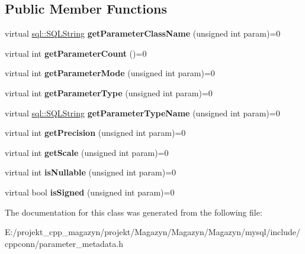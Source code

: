\subsection*{Public Member Functions}
\begin{DoxyCompactItemize}
\item 
\hypertarget{classsql_1_1_parameter_meta_data_a4eac0bdf826073bab398b6c92a53b7fe}{}\label{classsql_1_1_parameter_meta_data_a4eac0bdf826073bab398b6c92a53b7fe} 
virtual \hyperlink{classsql_1_1_s_q_l_string}{sql\+::\+S\+Q\+L\+String} {\bfseries get\+Parameter\+Class\+Name} (unsigned int param)=0
\item 
\hypertarget{classsql_1_1_parameter_meta_data_a76300959d4703649ea996691ec9ddc70}{}\label{classsql_1_1_parameter_meta_data_a76300959d4703649ea996691ec9ddc70} 
virtual int {\bfseries get\+Parameter\+Count} ()=0
\item 
\hypertarget{classsql_1_1_parameter_meta_data_ab46c3024b12b4b7a75b81d32340bc53b}{}\label{classsql_1_1_parameter_meta_data_ab46c3024b12b4b7a75b81d32340bc53b} 
virtual int {\bfseries get\+Parameter\+Mode} (unsigned int param)=0
\item 
\hypertarget{classsql_1_1_parameter_meta_data_a604aefdf3399674c54548ffd6d09dbd7}{}\label{classsql_1_1_parameter_meta_data_a604aefdf3399674c54548ffd6d09dbd7} 
virtual int {\bfseries get\+Parameter\+Type} (unsigned int param)=0
\item 
\hypertarget{classsql_1_1_parameter_meta_data_ae2dce4bf0b8a3e5194406f7d7d07eb88}{}\label{classsql_1_1_parameter_meta_data_ae2dce4bf0b8a3e5194406f7d7d07eb88} 
virtual \hyperlink{classsql_1_1_s_q_l_string}{sql\+::\+S\+Q\+L\+String} {\bfseries get\+Parameter\+Type\+Name} (unsigned int param)=0
\item 
\hypertarget{classsql_1_1_parameter_meta_data_a85a283b336695e7518cb35836b81cd6b}{}\label{classsql_1_1_parameter_meta_data_a85a283b336695e7518cb35836b81cd6b} 
virtual int {\bfseries get\+Precision} (unsigned int param)=0
\item 
\hypertarget{classsql_1_1_parameter_meta_data_aea9fa32949a6c4ccf6ef438d0e18fd2c}{}\label{classsql_1_1_parameter_meta_data_aea9fa32949a6c4ccf6ef438d0e18fd2c} 
virtual int {\bfseries get\+Scale} (unsigned int param)=0
\item 
\hypertarget{classsql_1_1_parameter_meta_data_aea4cfff3a14bc4b5a7e51f97ee7f1c56}{}\label{classsql_1_1_parameter_meta_data_aea4cfff3a14bc4b5a7e51f97ee7f1c56} 
virtual int {\bfseries is\+Nullable} (unsigned int param)=0
\item 
\hypertarget{classsql_1_1_parameter_meta_data_a1a6ee69d7780d6747cf8ee873b272f6a}{}\label{classsql_1_1_parameter_meta_data_a1a6ee69d7780d6747cf8ee873b272f6a} 
virtual bool {\bfseries is\+Signed} (unsigned int param)=0
\end{DoxyCompactItemize}


The documentation for this class was generated from the following file\+:\begin{DoxyCompactItemize}
\item 
E\+:/projekt\+\_\+cpp\+\_\+magazyn/projekt/\+Magazyn/\+Magazyn/\+Magazyn/mysql/include/cppconn/parameter\+\_\+metadata.\+h\end{DoxyCompactItemize}

